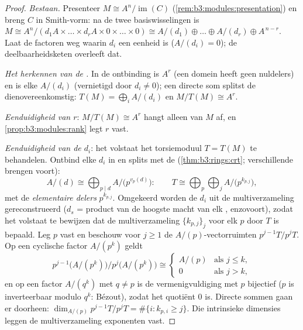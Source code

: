 \begin{proof}
\emph{Bestaan.} Presenteer $M \cong A^n/\operatorname{im}(C)$
(\cref{rem:b3:modules:presentation}) en breng $C$ in Smith-vorm: na
de twee basiswisselingen is $M \cong A^n / (d_1A \times \dots
\times d_rA \times 0 \times \dots \times 0) \cong A/(d_1) \oplus
\dots \oplus A/(d_r) \oplus A^{\,n - r}$. Laat de factoren weg
waarin $d_i$ een eenheid is ($A/(d_i) = 0$); de
deelbaarheidsketen overleeft dat.

\emph{Het herkennen van de .} In de ontbinding is $A^r$
 (een domein heeft geen nuldelers) en is elke $A/(d_i)$
 (vernietigd door $d_i \ne 0$); een directe som splitst de
 dienovereenkomstig: $T(M) = \bigoplus_i A/(d_i)$ en $M/T(M)
\cong A^r$.

\emph{Eenduidigheid van $r$}: $M/T(M) \cong A^r$ hangt alleen van
$M$ af, en \cref{prop:b3:modules:rank} legt $r$ vast.

\emph{Eenduidigheid van de $d_i$}: het volstaat het torsiemoduul $T
= T(M)$ te behandelen. Ontbind elke $d_i$ in  en
splits met de  (\cref{thm:b3:rings:crt};
verschillende  brengen  voort):
\[
A/(d) \cong \bigoplus_{p \mid d} A/\bigl(p^{v_p(d)}\bigr):
\qquad
T \cong \bigoplus_{p} \bigoplus_{j} A/\bigl(p^{k_{p,j}}\bigr),
\]
met de \emph{elementaire delers}
$p^{k_{p,j}}$. Omgekeerd worden de $d_i$ uit de multiverzameling
 gereconstrueerd ($d_s$ = product van de hoogste
macht van elk , enzovoort), zodat het volstaat te
bewijzen dat de multiverzameling $\{k_{p,j}\}_j$ voor elk
 $p$ door $T$ is bepaald. Leg $p$ vast en beschouw voor
$j \geq 1$ de $A/(p)$-vectorruimten $p^{j-1}T/p^jT$. Op een
cyclische factor $A/(p^k)$ geldt
\[
p^{j-1}\bigl(A/(p^k)\bigr)\big/p^{j}\bigl(A/(p^k)\bigr)
\cong
\begin{cases}
A/(p) & \text{als } j \leq k,\\
0 & \text{als } j > k,
\end{cases}
\]
en op een factor $A/(q^k)$ met $q \neq p$ is de vermenigvuldiging
met $p$ bijectief ($p$ is inverteerbaar modulo $q^k$: Bézout),
zodat het quotiënt $0$ is. Directe sommen gaan er doorheen:
$\dim_{A/(p)} p^{j-1}T/p^jT = \#\{i : k_{p,i} \geq j\}$. Die
intrinsieke dimensies leggen de multiverzameling exponenten vast.
\end{proof}

